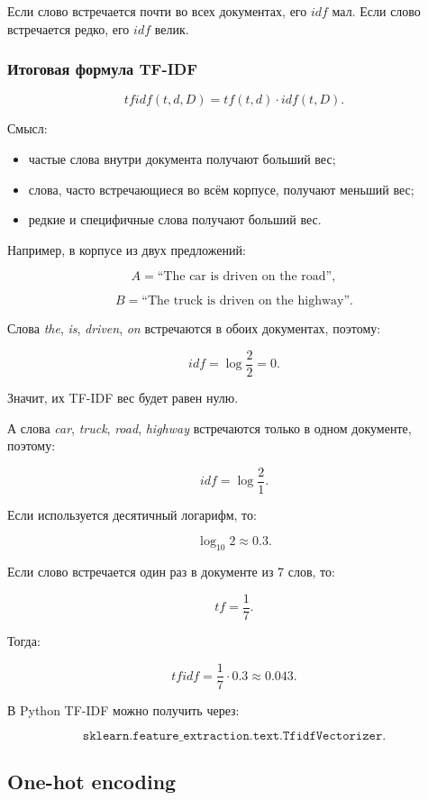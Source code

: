 \documentclass[a4paper,12pt]{article}
\begin{document}
Если слово встречается почти во всех документах, его \(idf\) мал. Если слово встречается редко, его \(idf\) велик.

\subsubsection{Итоговая формула TF-IDF}

\[
tfidf(t,d,D)
=
tf(t,d) \cdot idf(t,D).
\]

Смысл:

\begin{itemize}
    \item частые слова внутри документа получают больший вес;
    \item слова, часто встречающиеся во всём корпусе, получают меньший вес;
    \item редкие и специфичные слова получают больший вес.
\end{itemize}

Например, в корпусе из двух предложений:

\[
A = \text{``The car is driven on the road''},
\]

\[
B = \text{``The truck is driven on the highway''}.
\]

Слова \textit{the}, \textit{is}, \textit{driven}, \textit{on} встречаются в обоих документах, поэтому:

\[
idf = \log \frac{2}{2} = 0.
\]

Значит, их TF-IDF вес будет равен нулю.

А слова \textit{car}, \textit{truck}, \textit{road}, \textit{highway} встречаются только в одном документе, поэтому:

\[
idf = \log \frac{2}{1}.
\]

Если используется десятичный логарифм, то:

\[
\log_{10} 2 \approx 0.3.
\]

Если слово встречается один раз в документе из 7 слов, то:

\[
tf = \frac{1}{7}.
\]

Тогда:

\[
tfidf = \frac{1}{7} \cdot 0.3 \approx 0.043.
\]

В Python TF-IDF можно получить через:

\[
\texttt{sklearn.feature\_extraction.text.TfidfVectorizer}.
\]

\subsection{One-hot encoding}
\end{document}
